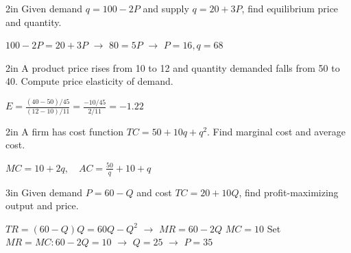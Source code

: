 \documentclass[12pt]{exam}
\begin{document}
\begin{questions}
    \begin{problem}[10]{2in}
    Given demand $q = 100 - 2P$ and supply $q = 20 + 3P$, find equilibrium price and quantity.
    \end{problem}
    \begin{solution}
        $100 - 2P = 20 + 3P$ $\rightarrow$ $80 = 5P$ $\rightarrow$ $P = 16, q = 68$
    \end{solution}

    \begin{problem}[10]{2in}
    A product price rises from 10 to 12 and quantity demanded falls from 50 to 40. Compute price elasticity of demand.
    \end{problem}
    \begin{solution}
        $E = \frac{(40-50)/45}{(12-10)/11} = \frac{-10/45}{2/11} = -1.22$
    \end{solution}

    \begin{problem}[10]{2in}
    A firm has cost function $TC = 50 + 10q + q^2$. Find marginal cost and average cost.
    \end{problem}
    \begin{solution}
        $MC = 10 + 2q,\quad AC = \frac{50}{q} + 10 + q$
    \end{solution}

    \begin{problem}[10]{3in}
    Given demand $P = 60 - Q$ and cost $TC = 20 + 10Q$, find profit-maximizing output and price.
    \end{problem}
    \begin{solution}
        $TR = (60-Q)Q = 60Q - Q^2$ $\rightarrow$ $MR = 60 - 2Q$
        $MC = 10$
        Set $MR = MC: 60 - 2Q = 10$ $\rightarrow$ $Q = 25$ $\rightarrow$ $P = 35$
    \end{solution}



\end{questions}
\end{document}
